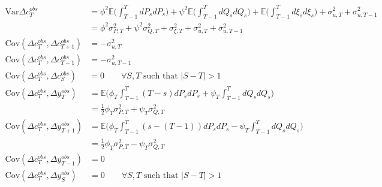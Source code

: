 \begin{align}
\mathrm{Var}{\Delta c^{obs}_T} &= \phi^2 \mathbb{E}\Big( \int_{T-1}^{T} dP_s dP_s \Big) + \psi^2 \mathbb{E}\Big( \int_{T-1}^{T} dQ_s dQ_s \Big) + \mathbb{E} \Big( \int_{T-1}^{T} d\xi_s d\xi_s \Big) +  \sigma^2_{u,T} +  \sigma^2_{u,T-1} \nonumber \\
&= \phi^2 \sigma^2_{P,T} + \psi^2 \sigma^2_{Q,T} + \sigma^2_{\xi,T}+\sigma^2_{u,T}+   \sigma^2_{u,T-1}  \\
\mathrm{Cov}(\Delta c^{obs}_T, \Delta c_{T+1}^{obs}) &= -\sigma^2_{u,T} \\
\mathrm{Cov}(\Delta c^{obs}_T, \Delta c_{T-1}^{obs}) &= -\sigma^2_{u,T-1} \\
\mathrm{Cov}(\Delta c^{obs}_T, \Delta c_S^{obs}) &= 0 \qquad \forall S,T \text{ such that }|S-T| >1 
\end{align}
\begin{align}
\mathrm{Cov}(\Delta c^{obs}_T, \Delta y^{obs}_T) &=  \mathbb{E} \Big( \phi_T \int_{T-1}^{T} (T-s) dP_s dP_s + \psi_T \int_{T-1}^{T} dQ_s dQ_s \Big) \nonumber \\
&= \frac{1}{2} \phi_T \sigma^2_{P,T} + \psi_T \sigma^2_{Q,T} \\
\mathrm{Cov}(\Delta c^{obs}_T, \Delta y^{obs}_{T+1}) &=  \mathbb{E} \Big( \phi_T \int_{T-1}^{T} (s-(T-1)) dP_s dP_s - \psi_T \int_{T-1}^{T} dQ_s dQ_s \Big) \nonumber \\
&= \frac{1}{2} \phi_T \sigma^2_{P,T} - \psi_T \sigma^2_{Q,T} \\
\mathrm{Cov}(\Delta c^{obs}_T, \Delta y^{obs}_{T-1}) &= 0 \\
\mathrm{Cov}(\Delta c^{obs}_T, \Delta y^{obs}_{S}) &= 0 \qquad \forall S,T \text{ such that }|S-T| >1 
\end{align}
